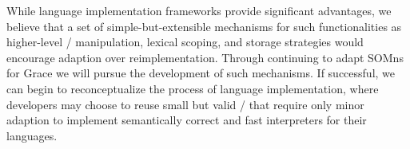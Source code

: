 While language implementation frameworks provide significant advantages, we believe that a set of simple-but-extensible mechanisms for such functionalities as higher-level \AST/ manipulation, lexical scoping, and storage strategies would encourage adaption over reimplementation. Through continuing to adapt SOMns for Grace we will pursue the development of such mechanisms. If successful, we can begin to reconceptualize the process of language implementation, where developers may choose to reuse small but valid \vms/ that require only minor adaption to implement semantically correct and fast interpreters for their languages.

%
